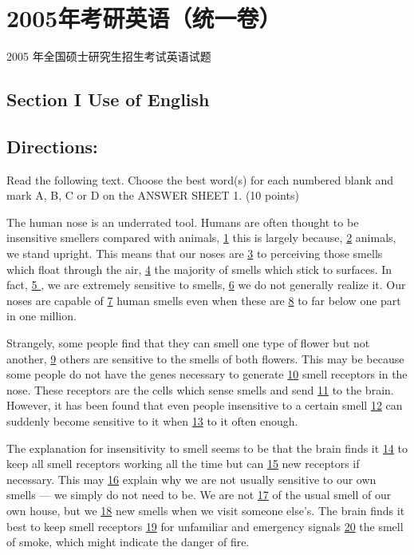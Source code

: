 \documentclass[UTF8,11pt]{ctexart}
\begin{document}
\section*{2005年考研英语（统一卷）}
2005 年全国硕士研究生招生考试英语试题


\subsection*{\textbf{Section I Use of English}}


\subsection*{\textbf{Directions:}}


Read the following text. Choose the best word(s) for each numbered blank and mark A, B, C or D on the ANSWER SHEET 1. (10 points)


The human nose is an underrated tool. Humans are often thought to be insensitive smellers compared with animals, \uline{1} this is largely because, \uline{2} animals, we stand upright. This means that our noses are \uline{3} to perceiving those smells which float through the air, \uline{4} the majority of smells which stick to surfaces. In fact, \uline{5 }, we are extremely sensitive to smells, \uline{6} we do not generally realize it. Our noses are capable of \uline{7} human smells even when these are \uline{8} to far below one part in one million.


Strangely, some people find that they can smell one type of flower but not another, \uline{9} others are sensitive to the smells of both flowers. This may be because some people do not have the genes necessary to generate \uline{10} smell receptors in the nose. These receptors are the cells which sense smells and send \uline{11} to the brain. However, it has been found that even people insensitive to a certain smell \uline{12} can suddenly become sensitive to it when \uline{13} to it often enough.


The explanation for insensitivity to smell seems to be that the brain finds it \uline{14} to keep all smell receptors working all the time but can \uline{15} new receptors if necessary. This may \uline{16} explain why we are not usually sensitive to our own smells — we simply do not need to be. We are not \uline{17} of the usual smell of our own house, but we \uline{18} new smells when we visit someone else’s. The brain finds it best to keep smell receptors \uline{19} for unfamiliar and emergency signals \uline{20} the smell of smoke, which might indicate the danger of fire.
\end{document}
